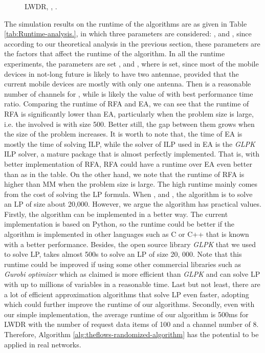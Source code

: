 \documentclass[11pt,english,onecolumn,draftcls]{IEEEtran}
\theoremstyle{plain}
\theoremstyle{plain}
\theoremstyle{plain}
\theoremstyle{plain}
\begin{document}
\begin{figure}
\subfloat[, n=400, .]{\texttt{[image: m2mm]}

} 

\protect\caption{\label{fig:gamma}LWDR, , . }
\end{figure}


The simulation results on the runtime of the algorithms are as given
in Table \ref{tab:Runtime-analysis.}, in which three parameters are
considered: ,  and , since according to our theoretical
analysis in the previous section, these parameters are the factors
that affect the runtime of the algorithm. In all the runtime experiments,
the parameters are set ,  and , where
 is set, since most of the mobile devices in not-long future
is likely to have two antennae, provided that the current mobile devices
are mostly with only one antenna. Then  is a reasonable number
of channels for , while  is likely the value
of  with best performance time ratio. Comparing the runtime
of RFA and EA, we can see that the runtime of RFA is significantly
lower than EA, particularly when the problem size is large, i.e. the
involved  is with size 500. Better still, the gap between them
grows when the size of the problem increases. It is worth to note
that, the time of EA is mostly the time of solving ILP, while the
solver of ILP used in EA is the \emph{GLPK} ILP solver, a mature package
that is almost perfectly implemented. That is, with better implementation
of RFA, RFA could have a runtime over EA even better than as in the
table. On the other hand, we note that the runtime of RFA is higher
than MM when the problem size is large. The high runtime mainly comes
from the cost of solving the LP formula. When ,  and
, the algorithm is to solve an LP of size about 20,000.
However, we argue the algorithm has practical values. Firstly, the
algorithm can be implemented in a better way. The current implementation
is based on Python, so the runtime could be better if the algorithm
is implemented in other languages such as C or C++ that is known with
a better performance. Besides, the open source library \emph{GLPK}
that we used to solve LP, takes almost 500s to solve an LP of size
20, 000. Note that this runtime could be improved if using some other
commercial libraries such as \emph{Gurobi optimizer} which as claimed
is more efficient than \emph{GLPK} and can solve LP with up to millions
of variables in a reasonable time. Last but not least, there are a
lot of efficient approximation algorithms that solve LP even faster,
adopting which could further improve the runtime of our algorithms.
Secondly, even with our simple implementation, the average runtime
of our algorithm is 500ms for LWDR with the number of request data
items of 100 and a channel number of 8. Therefore, Algorithm \ref{alg:theflows-randomized-algorithm}
has the potential to be applied in real networks.
\end{document}
